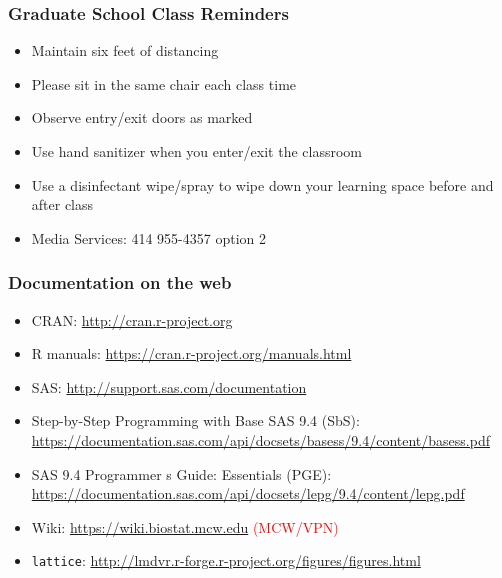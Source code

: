 \documentclass[11pt,pdftex,dvipsnames,usenames,helvetica]{beamer}
\begin{document}
\boldmath

\begin{frame}
\frametitle{Graduate School Class Reminders}

\begin{itemize}
\item Maintain six feet of distancing
\item Please sit in the same chair each class time
\item Observe entry/exit doors as marked
\item Use hand sanitizer when you enter/exit the classroom
\item Use a disinfectant wipe/spray to wipe down your learning space
  before and after class
\item Media Services: 414 955-4357 option 2
\end{itemize}

\end{frame}

\begin{frame}
\frametitle{Documentation on the web}

\begin{itemize}
\item CRAN: \url{http://cran.r-project.org}
\item R manuals: \url{https://cran.r-project.org/manuals.html}
\item SAS: \url{http://support.sas.com/documentation}
\item Step-by-Step Programming with Base SAS 9.4 (SbS): \\
\url{https://documentation.sas.com/api/docsets/basess/9.4/content/basess.pdf}
\item SAS 9.4 Programmer s Guide: Essentials (PGE): \\
\url{https://documentation.sas.com/api/docsets/lepg/9.4/content/lepg.pdf}
\item Wiki: \url{https://wiki.biostat.mcw.edu} 
\textcolor{red}{(MCW/VPN)}
\item {\tt lattice}: \url{http://lmdvr.r-forge.r-project.org/figures/figures.html}
\end{itemize}

\end{frame}
\end{document}
